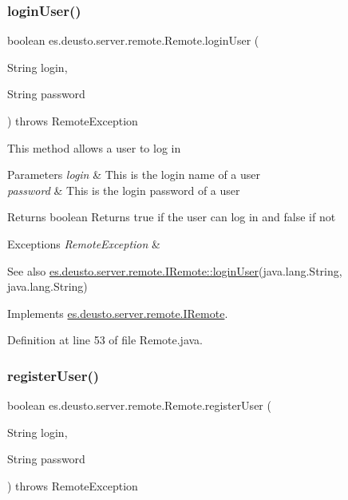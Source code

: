 \subsubsection{\texorpdfstring{login\+User()}{loginUser()}}
{\footnotesize\ttfamily boolean es.\+deusto.\+server.\+remote.\+Remote.\+login\+User (\begin{DoxyParamCaption}\item[{String}]{login,  }\item[{String}]{password }\end{DoxyParamCaption}) throws Remote\+Exception}

This method allows a user to log in 
\begin{DoxyParams}{Parameters}
{\em login} & This is the login name of a user \\
\hline
{\em password} & This is the login password of a user \\
\hline
\end{DoxyParams}
\begin{DoxyReturn}{Returns}
boolean Returns true if the user can log in and false if not 
\end{DoxyReturn}

\begin{DoxyExceptions}{Exceptions}
{\em Remote\+Exception} & \\
\hline
\end{DoxyExceptions}
\begin{DoxySeeAlso}{See also}
\hyperlink{interfacees_1_1deusto_1_1server_1_1remote_1_1_i_remote_a19acdbd6565b0f00cbe860a3316071ad}{es.\+deusto.\+server.\+remote.\+I\+Remote\+::login\+User}(java.\+lang.\+String, java.\+lang.\+String) 
\end{DoxySeeAlso}


Implements \hyperlink{interfacees_1_1deusto_1_1server_1_1remote_1_1_i_remote_a19acdbd6565b0f00cbe860a3316071ad}{es.\+deusto.\+server.\+remote.\+I\+Remote}.



Definition at line 53 of file Remote.\+java.

\mbox{\label{classes_1_1deusto_1_1server_1_1remote_1_1_remote_a4b013f75d23e2c9f0dbca2d3bb467f6a}} 
\subsubsection{\texorpdfstring{register\+User()}{registerUser()}}
{\footnotesize\ttfamily boolean es.\+deusto.\+server.\+remote.\+Remote.\+register\+User (\begin{DoxyParamCaption}\item[{String}]{login,  }\item[{String}]{password }\end{DoxyParamCaption}) throws Remote\+Exception}

